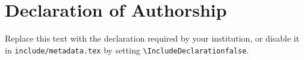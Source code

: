 \section*{Declaration of Authorship}

Replace this text with the declaration required by your institution, or disable
it in \texttt{include/metadata.tex} by setting \texttt{\textbackslash IncludeDeclarationfalse}.
